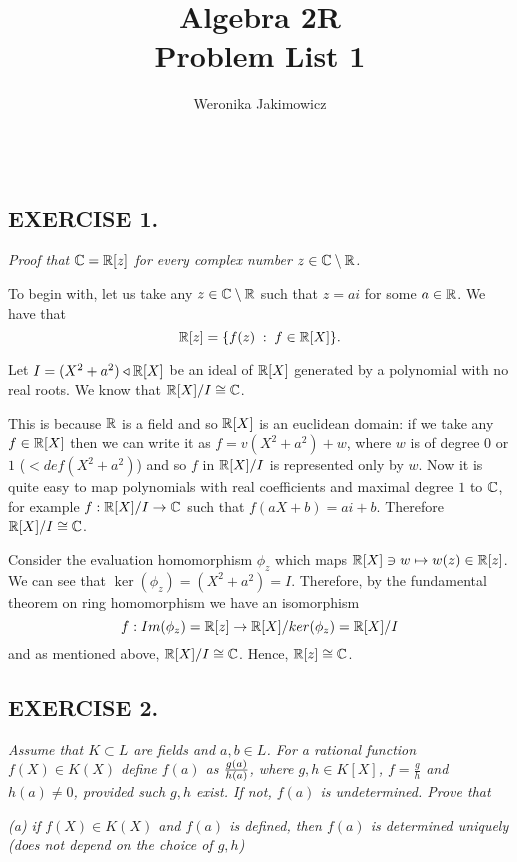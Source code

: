 \documentclass{article}
\title{\large Algebra 2R\smallskip\\ \textbf{Problem List 1}}
\author{\normalsize Weronika Jakimowicz}
\date{~~~}
\begin{document}
\maketitle
\thispagestyle{empty}

\subsection*{EXERCISE 1.}
\emph{Proof that $\mathbb{C}=\mathbb{R}[z]$ for every complex number $z\in \mathbb{C}\setminus\mathbb{R}$.}
\smallskip

To begin with, let us take any $z\in\mathbb{C}\setminus\mathbb{R}$ such that $z=ai$ for some $a\in\mathbb{R}$. We have that
$$\mathbb{R}[z]=\{f(z)\;:\;f\in\mathbb{R}[X]\}.$$

Let $I=(X^2+a^2)\triangleleft\mathbb{R}[X]$ be an ideal of $\mathbb{R}[X]$ generated by a polynomial with no real roots. We know that $\mathbb{R}[X]/I\cong \mathbb{C}$. 

This is because $\mathbb{R}$ is a field and so $\mathbb{R}[X]$ is an euclidean domain: if we take any $f\in\mathbb{R}[X]$ then we can write it as $f=v(X^2+a^2)+w$, where $w$ is of degree $0$ or $1$ ($<def(X^2+a^2)$) and so $f$ in $\mathbb{R}[X]/I$ is represented only by $w$. Now it is quite easy to map polynomials with real coefficients and maximal degree $1$ to $\mathbb{C}$, for example $f:\mathbb{R}[X]/I\to\mathbb{C}$ such that $f(aX+b)=ai+b$. Therefore $\mathbb{R}[X]/I\cong \mathbb{C}$.

Consider the evaluation homomorphism $\phi_z$ which maps $\mathbb{R}[X]\ni w\mapsto w(z)\in\mathbb{R}[z]$. We can see that $\ker(\phi_z)=(X^2+a^2)=I$. Therefore, by the fundamental theorem on ring homomorphism we have an isomorphism
$$f:Im(\phi_z)=\mathbb{R}[z]\to \mathbb{R}[X]/ker(\phi_z)=\mathbb{R}[X]/I$$
and as mentioned above, $\mathbb{R}[X]/I\cong\mathbb{C}$. Hence, $\mathbb{R}[z]\cong\mathbb{C}$.

\proofend

\subsection*{EXERCISE 2.}
\emph{\color{pink}Assume that $K\subset L$ are fields and $a,b\in L$. For a rational function $f(X)\in K(X)$ define $f(a)$ as ${g(a)\over h(a)}$, where $g,h\in K[X]$, $f=\frac gh$ and $h(a)\neq 0$, provided such $g,h$ exist. If not, $f(a)$ is undetermined. Prove that}
\smallskip

\emph{\color{pink}(a) if $f(X)\in K(X)$ and $f(a)$ is defined, then $f(a)$ is determined uniquely (does not depend on the choice of $g, h$)}
\smallskip

\end{document}
